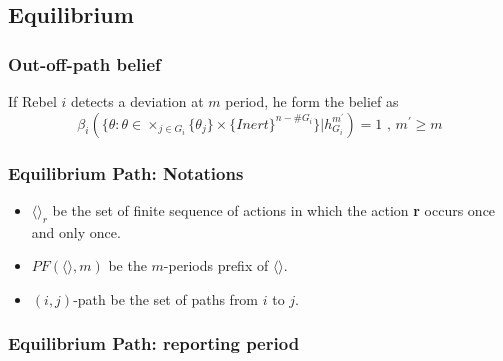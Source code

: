 \documentclass[12pt,letter]{article}
\theoremstyle{definition}
\theoremstyle{remark}
\theoremstyle{claim}
\begin{document}
\subsection{Equilibrium}

\subsubsection{Out-off-path belief}

If Rebel $i$ detects a deviation at $m$ period, he form the belief as
\begin{equation}
\beta_{i}(\{\theta:\theta\in \times_{j\in G_i}\{\theta_j\}\times\{Inert\}^{n-\#G_i}\}|h^{m^{'}}_{G_i})=1 \text{ , } m^{'}\geq m
\end{equation}



\subsubsection{Equilibrium Path: Notations}


\begin{itemize}

\item $\langle \rangle_r$ be the set of finite sequence of actions in which the action \textbf{r} occurs once and only once.
\item $PF(\langle \rangle,m)$ be the $m$-periods prefix of $\langle \rangle$.
\item $(i,j)$-path be the set of paths from $i$ to $j$.

\end{itemize}

\subsubsection{Equilibrium Path: reporting period}
\end{document}
